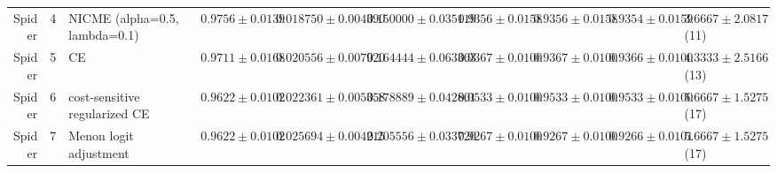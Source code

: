 \begin{tabular}{rlllllllll}
Spider & 4 & NICME (alpha=0.5, lambda=0.1) & $0.9756 \pm 0.0139$ & $0.018750 \pm 0.004390$ & $0.150000 \pm 0.035119$ & $0.9356 \pm 0.0158$ & $0.9356 \pm 0.0158$ & $0.9354 \pm 0.0159$ & $3.6667 \pm 2.0817$ (11) \\
Spider & 5 & CE & $0.9711 \pm 0.0168$ & $0.020556 \pm 0.007920$ & $0.164444 \pm 0.063363$ & $0.9367 \pm 0.0100$ & $0.9367 \pm 0.0100$ & $0.9366 \pm 0.0100$ & $4.3333 \pm 2.5166$ (13) \\
Spider & 6 & cost-sensitive regularized CE & $0.9622 \pm 0.0102$ & $0.022361 \pm 0.005358$ & $0.178889 \pm 0.042861$ & $0.9533 \pm 0.0100$ & $0.9533 \pm 0.0100$ & $0.9533 \pm 0.0100$ & $5.6667 \pm 1.5275$ (17) \\
Spider & 7 & Menon logit adjustment & $0.9622 \pm 0.0102$ & $0.025694 \pm 0.004215$ & $0.205556 \pm 0.033720$ & $0.9267 \pm 0.0100$ & $0.9267 \pm 0.0100$ & $0.9266 \pm 0.0101$ & $5.6667 \pm 1.5275$ (17) \\
\bottomrule
\end{tabular}
